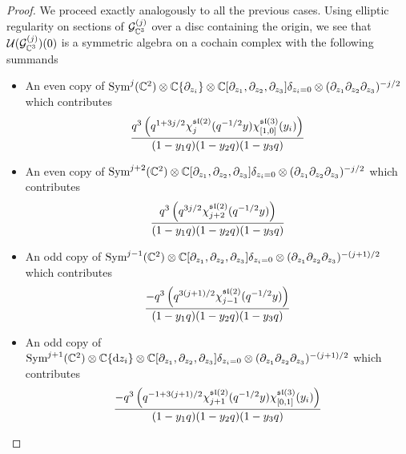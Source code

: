 \begin{proof}
We proceed exactly analogously to all the previous cases. Using elliptic regularity on sections of $\mathcal{G}^{(j)}_{\mathbb{C}^3}$ over a disc containing the origin, we see that $\mathcal{U} (\mathcal{G}^{(j)}_{\mathbb{C}^3} )(0)$ is a symmetric algebra on a cochain complex with the following summands

\begin{itemize}
\item An even copy of $\text{Sym}^j (\mathbb{C}^2) \otimes \mathbb{C}\{\partial_{z_i}\}\otimes \mathbb{C}[\partial_{z_1}, \partial_{z_2}, \partial_{z_3}]\delta_{z_i=0}\otimes (\partial_{z_1}\partial_{z_2}\partial_{z_3})^{-j/2}$ which contributes 
\begin{equation}
\frac{ q^{3} \left(  q^{1 + 3 j/2} \chi^{\mathfrak{sl}(2)}_{j}(q^{-1/2} y)\chi^{\mathfrak{sl}(3)}_{[1,0]}(y_i) \right)}{(1-y_1 q)(1-y_2q)(1-y_3q)}
\end{equation} 

\item An even copy of $\text{Sym}^{j+2} (\mathbb{C}^2) \otimes \mathbb{C}[\partial_{z_1}, \partial_{z_2}, \partial_{z_3}]\delta_{z_i=0}\otimes (\partial_{z_1}\partial_{z_2}\partial_{z_3})^{-j/2}$ which contributes 
\begin{equation}
\frac{ q^{3} \left( q^{3j/2} \chi^{\mathfrak{sl}(2)}_{j+2}(q^{-1/2} y)  \right)}{(1-y_1 q)(1-y_2q)(1-y_3q)}
\end{equation} 

\item An odd copy of $\text{Sym}^{j-1} (\mathbb{C}^2) \otimes \mathbb{C}[\partial_{z_1}, \partial_{z_2}, \partial_{z_3}]\delta_{z_i=0}\otimes (\partial_{z_1}\partial_{z_2}\partial_{z_3})^{-(j+1)/2}$ which contributes 
\begin{equation}
\frac{ - q^{3} \left( q^{3(j+1)/2} \chi^{\mathfrak{sl}(2)}_{j-1}(q^{-1/2}y) \right)}{(1-y_1 q)(1-y_2q)(1-y_3q)}
\end{equation} 

\item An odd copy of $\text{Sym}^{j+1} (\mathbb{C}^2) \otimes \mathbb{C}\{\mathrm{d} z_i\}\otimes \mathbb{C}[\partial_{z_1}, \partial_{z_2}, \partial_{z_3}]\delta_{z_i=0}\otimes (\partial_{z_1}\partial_{z_2}\partial_{z_3})^{-(j+1)/2}$ which contributes 
\begin{equation}
\frac{ - q^{3} \left( q^{-1 + 3(j+1)/2} \chi^{\mathfrak{sl}(2)}_{j+1} (q^{-1/2} y) \chi^{\mathfrak{sl}(3)}_{[0,1]}(y_i) \right)}{(1-y_1 q)(1-y_2q)(1-y_3q)}
\end{equation} 

\end{itemize}
\end{proof}

